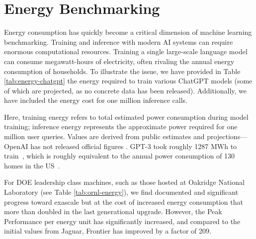 \section{Energy Benchmarking}
\label{sec:energy}

Energy consumption has quickly become a critical dimension of machine learning benchmarking. Training and inference with modern AI systems can require enormous computational resources. Training a single large-scale language model can consume megawatt-hours of electricity, often rivaling the annual energy consumption of households.  
To illustrate the issue, we have provided in Table \ref{tab:energy-chatgpt} the energy required to train various ChatGPT models (some of which are projected, as no concrete data has been released). Additionally, we have included the energy cost for one million inference calls.

Here, training energy refers to total estimated power consumption during model training; inference energy represents the approximate power required for one million user queries. Values are derived from public estimates and projections—OpenAI has not released official figures \cite{sciencefeedback2024energy,kaplan2020scaling}. GPT-3 took roughly 1287 MWh to train~\cite{patterson2021carbon}, which is roughly equivalent to the annual power consumption of 130 homes in the US~\cite{WECEnergy}. 

For DOE leadership class machines, such as those hosted at Oakridge National Laboratory (see Table \ref{tab:ornl-energy}), we find documented and significant progress toward exascale but at the cost of increased energy consumption that more than doubled in the last generational upgrade. However, the Peak Performance per energy unit has significantly increased, and compared to the initial values from Jaguar, Frontier has improved by a factor of 209.


\begin{table}[tb]
\centering
\caption{Estimated Energy Consumption of GPT Models for Training and Inference 
(based on \cite{brown2020language, patterson2021carbon, medium2023gpt4carbon, 
extremenetworks2023energy, epochai2024compute, hackernoon2024dirtysecret}).}
\label{tab:energy-chatgpt}
\end{table}

